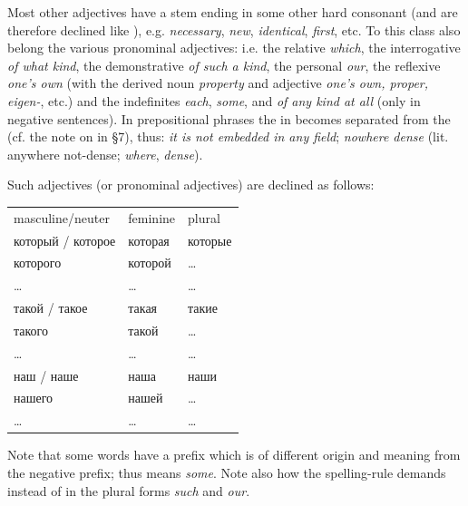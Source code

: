 \begin{enumerate}[label=\roman*)]
Most other adjectives have a stem ending in some other hard consonant (and are therefore declined like ), e.g.  \emph{necessary},  \emph{new},  \emph{identical},  \emph{first}, etc. To this class also belong the various pronominal adjectives: i.e. the relative  \emph{which}, the interrogative  \emph{of what kind}, the demonstrative  \emph{of such a kind}, the personal  \emph{our}, the reflexive  \emph{one's own} (with the derived noun  \emph{property} and adjective  \emph{one's own, proper, eigen-}, etc.) and the indefinites  \emph{each},  \emph{some}, and  \emph{of any kind at all} (only in negative sentences). In prepositional phrases the  in  becomes separated from the  (cf. the note on  in §7), thus:  \emph{it is not embedded in any field};  \emph{nowhere dense} (lit. anywhere not-dense;  \emph{where},  \emph{dense}).

Such adjectives (or pronominal adjectives) are declined as follows:

\begin{center}
\footnotesize
\begin{tabular}{@{}>{\cyrillicfont}p{40mm} >{\cyrillicfont}p{40mm} >{\cyrillicfont}p{40mm}@{}}
\normalfont masculine/neuter & \normalfont feminine & \normalfont plural\\
который / которое & которая & которые\\
которого & которой & \ldots\\
\ldots & \ldots & \ldots\\[1mm]
такой / такое & такая & такие\\
такого & такой & \ldots\\
\ldots & \ldots & \ldots\\[1mm]
наш / наше & наша & наши\\
нашего & нашей & \ldots\\
\ldots & \ldots & \ldots\\
\end{tabular}
\end{center}

Note that some words have a prefix  which is of different origin and meaning from the negative prefix; thus  means \emph{some}. Note also how the spelling-rule demands  instead of  in the plural forms  \emph{such} and  \emph{our}.


\end{enumerate}
